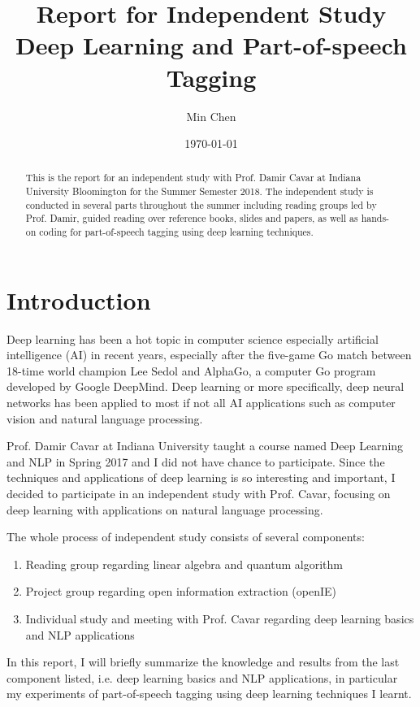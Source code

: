 \documentclass[11pt]{article}
\theoremstyle{plain}
\begin{document}
\title{Report for Independent Study\\
Deep Learning and Part-of-speech Tagging}
\author{Min Chen}
\date{\today}
\maketitle
\thispagestyle{fancy}

\begin{abstract}
	
This is the report for an independent study with Prof. Damir Cavar at Indiana 
University Bloomington for the Summer Semester 2018. The independent 
study is conducted in several parts throughout the summer including reading 
groups led by Prof. Damir, guided reading over reference books, slides and 
papers, as well as hands-on coding for part-of-speech tagging using deep 
learning techniques. 

\end{abstract}
\pagebreak
\tableofcontents
\listoffigures
\listoftables
\pagebreak


\section{Introduction}

Deep learning has been a hot topic in computer science especially artificial 
intelligence (AI) in recent years, especially after the five-game Go match 
between 18-time world champion Lee Sedol and AlphaGo, a computer Go 
program developed by Google DeepMind. Deep learning or more specifically, 
deep neural networks has been applied to most if not all AI applications such 
as computer vision and natural language processing. 

Prof. Damir Cavar at Indiana University taught a course named Deep Learning 
and NLP in Spring 2017 and I did not have chance to participate. Since the 
techniques and applications of deep learning is so interesting and important, 
I decided to participate in an independent study with Prof. Cavar, focusing on 
deep learning with applications on natural language processing. 

The whole process of independent study consists of several components: 
\begin{enumerate}
	\item Reading group regarding linear algebra and quantum algorithm
	\item Project group regarding open information extraction (openIE) 
	\item Individual study and meeting with Prof. Cavar regarding deep learning 
	basics and NLP applications
\end{enumerate}
In this report, I will briefly summarize the knowledge and results from the last 
component listed, i.e. deep learning basics and NLP applications, in particular 
my experiments of part-of-speech tagging using deep learning techniques I 
learnt. 
\end{document}
